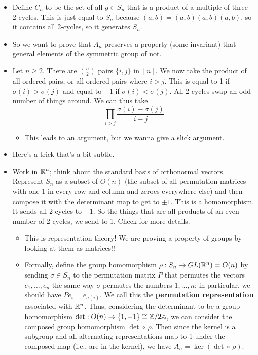 \documentclass[../notes.tex]{subfiles}
\begin{document}
\begin{itemize}
\begin{proof}
    \end{proof}
    \item Define $C_n$ to be the set of all $g\in S_n$ that is a product of a multiple of three 2-cycles. This is just equal to $S_n$ because $(a,b)=(a,b)(a,b)(a,b)$, so it contains all 2-cycles, so it generates $S_n$.
    \item So we want to prove that $A_n$ preserves a property (some invariant) that general elements of the symmetric group of not.
    \item Let $n\geq 2$. There are $\binom{n}{2}$ pairs $\{i,j\}$ in $[n]$. We now take the product of all ordered pairs, or all ordered pairs where $i>j$. This is equal to 1 if $\sigma(i)>\sigma(j)$ and equal to $-1$ if $\sigma(i)<\sigma(j)$. All 2-cycles swap an odd number of things around. We can thus take
    \begin{equation*}
        \prod_{i>j}\frac{\sigma(i)-\sigma(j)}{i-j}
    \end{equation*}
    \begin{itemize}
        \item This leads to an argument, but we wanna give a slick argument.
    \end{itemize}
    \item Here's a trick that's a bit subtle.
    \item Work in $\mathbb{R}^n$; think about the standard basis of orthonormal vectors. Represent $S_n$ as a subset of $O(n)$ (the subset of all permutation matrices with one 1 in every row and column and zeroes everywhere else) and then compose it with the determinant map to get to $\pm 1$. This is a homomorphism. It sends all 2-cycles to $-1$. So the things that are all products of an even number of 2-cycles, we send to 1. Check \textcite{bib:DummitFoote} for more details.
    \begin{itemize}
        \item This is representation theory! We are proving a property of groups by looking at them as matrices!!
        \item Formally, define the group homomorphism $\rho:S_n\to GL(\mathbb{R}^n)=O(n)$ by sending $\sigma\in S_n$ to the permutation matrix $P$ that permutes the vectors $e_1,\dots,e_n$ the same way $\sigma$ permutes the numbers $1,\dots,n$; in particular, we should have $Pe_i=e_{\sigma(i)}$. We call this the \textbf{permutation representation} associated with $\mathbb{R}^n$. Thus, considering the determinant to be a group homomorphism $\det:O(n)\to\{1,-1\}\cong\mathbb{Z}/2\mathbb{Z}$, we can consider the composed group homomorphism $\det\circ\,\rho$. Then since the kernel is a subgroup and all alternating representations map to 1 under the composed map (i.e., are in the kernel), we have $A_n=\ker(\det\circ\,\rho)$.

\end{itemize}
\end{itemize}
\end{document}
